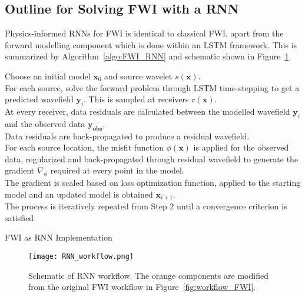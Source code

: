 \subsection{Outline for Solving FWI with a RNN}
Physics-informed RNNs for FWI is identical to classical FWI, apart from the forward modelling component which is done within an LSTM framework. This is summarized by Algorithm~\ref{algo:FWI_RNN} and schematic shown in Figure~\ref{fig:workflow_RNN}.
\begin{algorithm}
Choose an initial model $\boldsymbol{x}_0$ and source wavelet $s(\boldsymbol{x})$.\\
For each source, solve the forward problem through LSTM time-stepping to get a predicted wavefield $\boldsymbol{y}_i$. This is sampled at receivers $r(\boldsymbol{x})$.\\
At every receiver, data residuals are calculated between the modelled wavefield $\boldsymbol{y}_i$ and the observed data $\boldsymbol{y}_{\boldsymbol{obs}}$.\\
Data residuals are back-propagated to produce a residual wavefield.\\
For each source location, the misfit function $\phi(\boldsymbol{x})$ is applied for the observed data, regularized and back-propagated through residual wavefield to generate the gradient $\nabla_\phi$ required at every point in the model.\\
The gradient is scaled based on loss optimization function, applied to the starting model and an updated model is obtained $\boldsymbol{x}_{i+1}$.\\
The process is iteratively repeated from Step 2 until a convergence criterion is satisfied.
	\caption{FWI as RNN Implementation}
	\label{algo:FWI_RNN}
\end{algorithm}

\begin{figure}[ht!]
	\centering
	\texttt{[image: RNN\_workflow.png]}
	\caption[Schematic of RNN workflow]{Schematic of RNN workflow. The orange components are modified from the original FWI workflow in Figure~\ref{fig:workflow_FWI}.}
	\label{fig:workflow_RNN}
\end{figure}